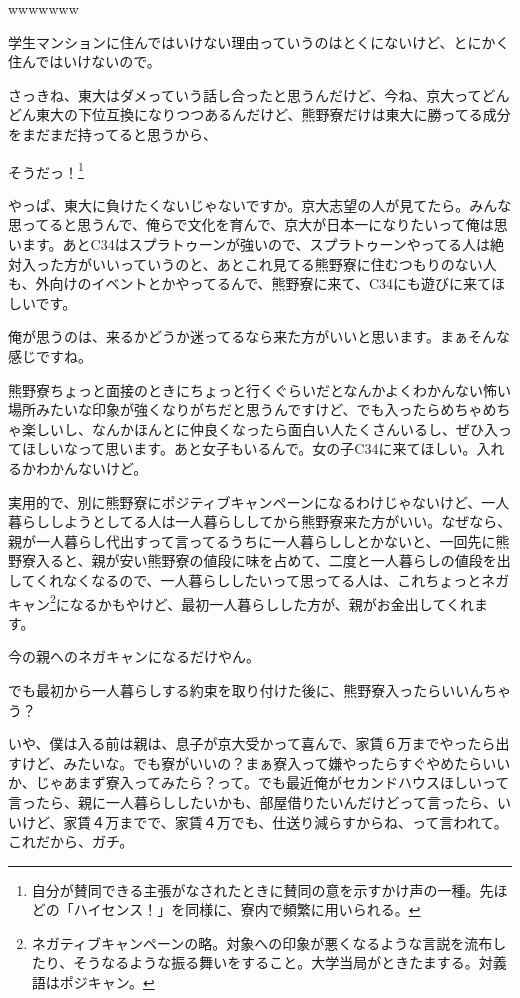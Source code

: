 \begin{multicols}{2}
  
wwwwwww

  
学生マンションに住んではいけない理由っていうのはとくにないけど、とにかく住んではいけないので。

  
さっきね、東大はダメっていう話し合ったと思うんだけど、今ね、京大ってどんどん東大の下位互換になりつつあるんだけど、熊野寮だけは東大に勝ってる成分をまだまだ持ってると思うから、

  
そうだっ！\footnote{自分が賛同できる主張がなされたときに賛同の意を示すかけ声の一種。先ほどの「ハイセンス！」を同様に、寮内で頻繁に用いられる。}

  
やっぱ、東大に負けたくないじゃないですか。京大志望の人が見てたら。みんな思ってると思うんで、俺らで文化を育んで、京大が日本一になりたいって俺は思います。あとC34はスプラトゥーンが強いので、スプラトゥーンやってる人は絶対入った方がいいっていうのと、あとこれ見てる熊野寮に住むつもりのない人も、外向けのイベントとかやってるんで、熊野寮に来て、C34にも遊びに来てほしいです。

  
俺が思うのは、来るかどうか迷ってるなら来た方がいいと思います。まぁそんな感じですね。

  
熊野寮ちょっと面接のときにちょっと行くぐらいだとなんかよくわかんない怖い場所みたいな印象が強くなりがちだと思うんですけど、でも入ったらめちゃめちゃ楽しいし、なんかほんとに仲良くなったら面白い人たくさんいるし、ぜひ入ってほしいなって思います。あと女子もいるんで。女の子C34に来てほしい。入れるかわかんないけど。

  
実用的で、別に熊野寮にポジティブキャンペーンになるわけじゃないけど、一人暮らししようとしてる人は一人暮らししてから熊野寮来た方がいい。なぜなら、親が一人暮らし代出すって言ってるうちに一人暮らししとかないと、一回先に熊野寮入ると、親が安い熊野寮の値段に味を占めて、二度と一人暮らしの値段を出してくれなくなるので、一人暮らししたいって思ってる人は、これちょっとネガキャン\footnote{ネガティブキャンペーンの略。対象への印象が悪くなるような言説を流布したり、そうなるような振る舞いをすること。大学当局がときたまする。対義語はポジキャン。}になるかもやけど、最初一人暮らしした方が、親がお金出してくれます。

  
今の親へのネガキャンになるだけやん。

  
でも最初から一人暮らしする約束を取り付けた後に、熊野寮入ったらいいんちゃう？

  
いや、僕は入る前は親は、息子が京大受かって喜んで、家賃６万までやったら出すけど、みたいな。でも寮がいいの？まぁ寮入って嫌やったらすぐやめたらいいか、じゃあまず寮入ってみたら？って。でも最近俺がセカンドハウスほしいって言ったら、親に一人暮らししたいかも、部屋借りたいんだけどって言ったら、いいけど、家賃４万までで、家賃４万でも、仕送り減らすからね、って言われて。これだから、ガチ。


\end{multicols}
